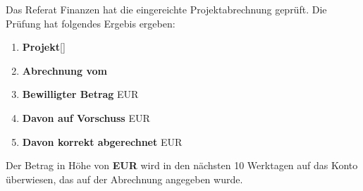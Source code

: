 Das Referat Finanzen hat die eingereichte Projektabrechnung geprüft.
Die Prüfung hat folgendes Ergebis ergeben:

\begin{enumerate}[label=\Roman*]
\item \textbf{Projekt}\hfill [] 
\item \textbf{Abrechnung vom} \hfill {}
\item \textbf{Bewilligter Betrag} \hfill {} EUR 
\item \textbf{Davon auf Vorschuss} \hfill {} EUR
\item \textbf{Davon korrekt abgerechnet} \hfill {} EUR
\end{enumerate}
Der Betrag in Höhe von \textbf{ EUR} wird in den nächsten 10 Werktagen auf das Konto überwiesen, das auf der Abrechnung angegeben wurde.